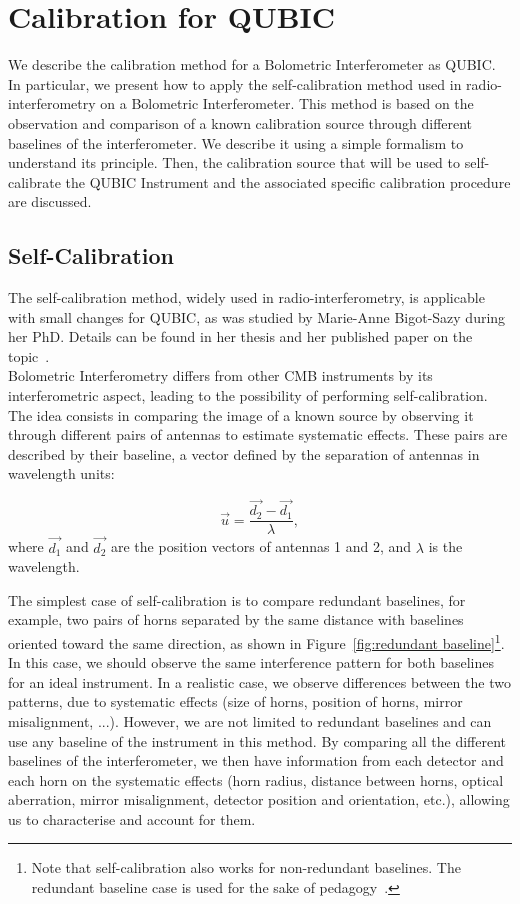 \documentclass[../../thesis.tex]{subfiles}
\begin{document}
\section{Calibration for QUBIC}
We describe the calibration method for a Bolometric Interferometer as QUBIC. In particular, we present how to apply the self-calibration method used in radio-interferometry on a Bolometric Interferometer. This method is based on the observation and comparison of a known calibration source through different baselines of the interferometer. We describe it using a simple formalism to understand its principle. Then, the calibration source that will be used to self-calibrate the QUBIC Instrument and the associated specific calibration procedure are discussed.

\subsection{Self-Calibration} \label{sub:selfcal}
The self-calibration method, widely used in radio-interferometry, is applicable with small changes for QUBIC, as was studied by Marie-Anne Bigot-Sazy during her PhD. Details can be found in her thesis\cite{thesismarie} and her published paper on the topic~\cite{paper_marie_selfcal}. \\
Bolometric Interferometry differs from other CMB instruments by its interferometric aspect, leading to the possibility of performing self-calibration. The idea consists in comparing the image of a known source by observing it through different pairs of antennas to estimate systematic effects. These pairs are described by their baseline, a vector defined by the separation of antennas in wavelength units:

\begin{equation}
    \vec{u} = \frac{\vec{d_2} - \vec{d_1}}{\lambda},
\end{equation}
where $\vec{d_1}$ and $\vec{d_2}$ are the position vectors of antennas 1 and 2, and $\lambda$ is the wavelength.

The simplest case of self-calibration is to compare redundant baselines, for example, two pairs of horns separated by the same distance with baselines oriented toward the same direction, as shown in Figure~\ref{fig:redundant baseline}\footnote{Note that self-calibration also works for non-redundant baselines. The redundant baseline case is used for the sake of pedagogy~\cite{paper_marie_selfcal}.}. In this case, we should observe the same interference pattern for both baselines for an ideal instrument. In a realistic case, we observe differences between the two patterns, due to systematic effects (size of horns, position of horns, mirror misalignment, ...). However, we are not limited to redundant baselines and can use any baseline of the instrument in this method\cite{paper_marie_selfcal}. By comparing all the different baselines of the interferometer, we then have information from each detector and each horn on the systematic effects (horn radius, distance between horns, optical aberration, mirror misalignment, detector position and orientation, etc.), allowing us to characterise and account for them.
\end{document}

